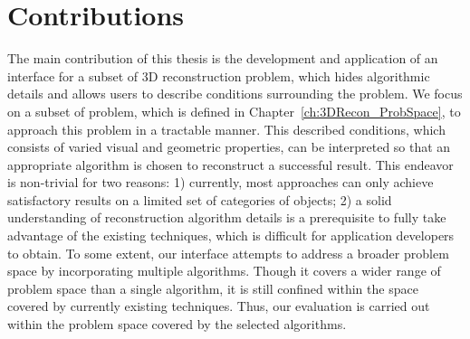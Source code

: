 \section{Contributions}
The main contribution of this thesis is the development and application of an interface for a subset of 3D reconstruction problem, which hides algorithmic details and allows users to describe conditions surrounding the problem. We focus on a subset of problem, which is defined in Chapter~\ref{ch:3DRecon_ProbSpace}, to approach this problem in a tractable manner. This described conditions, which consists of varied visual and geometric properties, can be interpreted so that an appropriate algorithm is chosen to reconstruct a successful result. This endeavor is non-trivial for two reasons: 1) currently, most approaches can only achieve satisfactory results on a limited set of categories of objects; 2) a solid understanding of reconstruction algorithm details is a prerequisite to fully take advantage of the existing techniques, which is difficult for application developers to obtain. To some extent, our interface attempts to address a broader problem space by incorporating multiple algorithms. Though it covers a wider range of problem space than a single algorithm, it is still confined within the space covered by currently existing techniques. Thus, our evaluation is carried out within the problem space covered by the selected algorithms.



